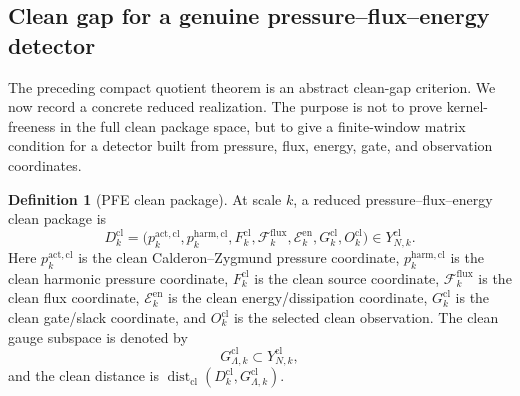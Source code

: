 \documentclass[11pt]{article}
\numberwithin{equation}{section}
\theoremstyle{plain}
\theoremstyle{definition}
\newtheorem{definition}[theorem]{Definition}
\theoremstyle{remark}
\newcommand{\cl}{\mathrm{cl}}
\newcommand{\harm}{\mathrm{harm}}
\newcommand{\Dist}{\operatorname{dist}}
\begin{document}
\subsection{Clean gap for a genuine pressure--flux--energy detector}

The preceding compact quotient theorem is an abstract clean-gap criterion.  We
now record a concrete reduced realization.  The purpose is not to prove
kernel-freeness in the full clean package space, but to give a finite-window
matrix condition for a detector built from pressure, flux, energy, gate, and
observation coordinates.

\begin{definition}[PFE clean package]\label{def:pfe-clean-package}
At scale \(k\), a reduced pressure--flux--energy clean package is
\[
  D_k^{\cl}=
  \bigl(
    p_k^{\mathrm{act},\cl},
    p_k^{\harm,\cl},
    F_k^{\cl},
    \mathcal F_k^{\mathrm{flux}},
    \mathcal E_k^{\mathrm{en}},
    G_k^{\cl},
    O_k^{\cl}
  \bigr)
  \in Y_{N,k}^{\cl}.
\]
Here \(p_k^{\mathrm{act},\cl}\) is the clean Calderon--Zygmund pressure
coordinate, \(p_k^{\harm,\cl}\) is the clean harmonic pressure coordinate,
\(F_k^{\cl}\) is the clean source coordinate, \(\mathcal F_k^{\mathrm{flux}}\)
is the clean flux coordinate, \(\mathcal E_k^{\mathrm{en}}\) is the clean
energy/dissipation coordinate, \(G_k^{\cl}\) is the clean gate/slack
coordinate, and \(O_k^{\cl}\) is the selected clean observation.  The clean
gauge subspace is denoted by
\[
  G_{\Lambda,k}^{\cl}\subset Y_{N,k}^{\cl},
\]
and the clean distance is \(\Dist_{\cl}(D_k^{\cl},G_{\Lambda,k}^{\cl})\).
\end{definition}
\end{document}
